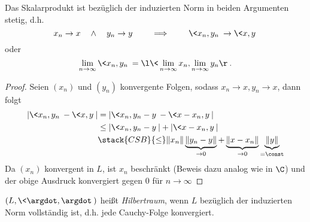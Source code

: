 \begin{kor}
	Das Skalarprodukt ist bezüglich der induzierten Norm in beiden Argumenten stetig, d.h.
	\[
		x_n \to x \quad\land\quad y_n \to y
		\qquad \implies \qquad
		\<x_n, y_n\> \to \<x,y\>
	\]
	oder
	\[
		\lim_{n\to \infty} \<x_n, y_n\> = \l\<\lim_{n\to \infty} x_n, \lim_{n\to\infty} y_n \r\>.
	\]
	\begin{proof}
	Seien $ (x_n) $ und $ (y_n) $ konvergente Folgen, sodass $ x_n \to x, y_n \to x $, dann folgt
		\begin{align*}
			|\<x_n,y_n\> - \<x,y\>|
			&= |\<x_n, y_n - y\> - \<x-x_n,y\>| \\
			&\le |\<x_n,y_n -y\>| + |\<x-x_n,y\>| \\
			&\stack{CSB}{\le} \|x_n\| \underbrace{\|y_n -y\|}_{\to 0} + \underbrace{\|x-x_n\|}_{\to 0} \underbrace{\|y\|}_{=\const}
			\end{align*}
		Da $(x_n)$ konvergent in $L$, ist $x_n$ beschränkt (Beweis dazu analog wie in $\C$) und der obige Ausdruck konvergiert gegen $ 0 $ für $ n\to \infty $
			
		
	\end{proof}
\end{kor}

\begin{df}[Hilbertraum] \label{1.5}
	$(L, \<\argdot, \argdot\>)$ heißt \emph{Hilbertraum}, wenn $L$ bezüglich der induzierten Norm vollständig ist, d.h. jede Cauchy-Folge konvergiert.
\end{df}

